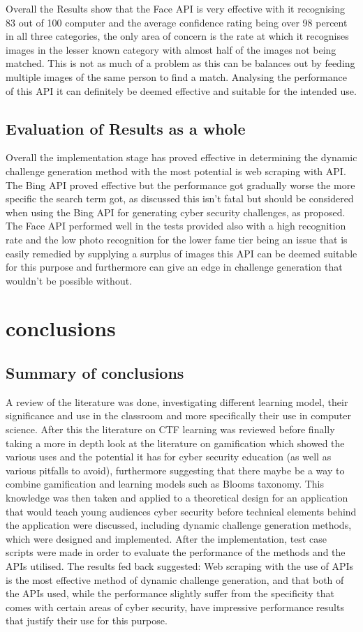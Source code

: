 \documentclass[12pt,a4paper]{article}
\begin{document}
Overall the Results show that the Face API is very effective with it recognising 83 out of 100 computer and the average confidence rating being over 98 percent in all three categories, the only area of concern is the rate at which it recognises images in the lesser known category with almost half of the images not being matched. This is not as much of a problem as this can be balances out by feeding multiple images of the same person to find a match. Analysing the performance of this API it can definitely be deemed effective and suitable for the intended use.  

\subsection{Evaluation of Results as a whole} 

Overall the implementation stage has proved effective in determining the dynamic challenge generation method with the most potential is web scraping with API. The Bing API proved effective but the performance got gradually worse the more specific the search term got, as discussed this isn't fatal but should be considered when using the Bing API for generating cyber security challenges, as proposed. The Face API performed well in the tests provided also with a high recognition rate and the low photo recognition for the lower fame tier being an issue that is easily remedied by supplying a surplus of images this API can be deemed suitable for this purpose and furthermore can give an edge in challenge generation that wouldn't be possible without. 


\newpage
\section{conclusions} 
\subsection{Summary of conclusions}
A review of the literature was done, investigating different learning model, their significance and use in the classroom and more specifically their use in computer science. After this the literature on CTF learning was reviewed before finally taking a more in depth look at the literature on gamification which showed the various uses and the potential it has for cyber security education (as well as various pitfalls to avoid), furthermore suggesting that there maybe be a way to combine gamification and learning models such as Blooms taxonomy. This knowledge was then taken and applied to a theoretical design for an application that would teach young audiences cyber security before technical elements behind the application were discussed, including dynamic challenge generation methods, which were designed and implemented. After the implementation, test case scripts were made in order to evaluate the performance of the methods and the APIs utilised. The results fed back suggested: Web scraping with the use of APIs is the most effective method of dynamic challenge generation, and that both of the APIs used, while the performance slightly suffer from the specificity  that comes with certain areas of cyber security, have impressive performance results that justify their use for this purpose.
\end{document}
